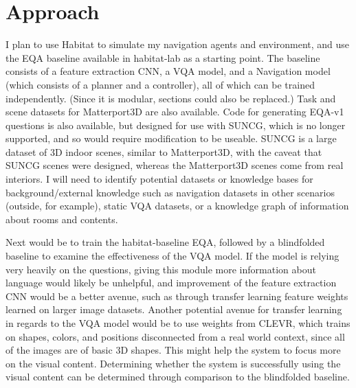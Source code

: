 \documentclass{article}
\begin{document}


\section{Approach}
I plan to use Habitat to simulate my navigation agents and environment, and use the EQA baseline available in habitat-lab as a starting point. The baseline consists of a feature extraction CNN, a VQA model, and a Navigation model (which consists of a planner and a controller), all of which can be trained independently. (Since it is modular, sections could also be replaced.) Task and scene datasets for Matterport3D are also available. Code for generating EQA-v1 questions is also available, but designed for use with SUNCG, %
which is no longer supported, and so would require modification to be useable\cite{embodiedqa}\cite{suncg}. SUNCG is a large dataset of 3D indoor scenes, similar to Matterport3D, with the caveat that SUNCG scenes were designed, whereas the Matterport3D scenes come from real interiors. I will need to identify potential datasets or knowledge bases for background/external knowledge such as navigation datasets in other scenarios (outside, for example), static VQA datasets, or a knowledge graph of information about rooms and contents. 


Next would be to train the habitat-baseline EQA, followed by a blindfolded baseline to examine the effectiveness of the VQA model. If the model is relying very heavily on the questions, giving this module more information about language would likely be unhelpful, and improvement of the feature extraction CNN would be a better avenue, such as through transfer learning feature weights learned on larger image datasets. Another potential avenue for transfer learning in regards to the VQA model would be to use weights from CLEVR, which trains on shapes, colors, and positions disconnected from a real world context, since all of the images are of basic 3D shapes\cite{clevr}. This might help the system to focus more on the visual content. Determining whether the system is successfully using the visual content can be determined through comparison to the blindfolded baseline. 
\end{document}
